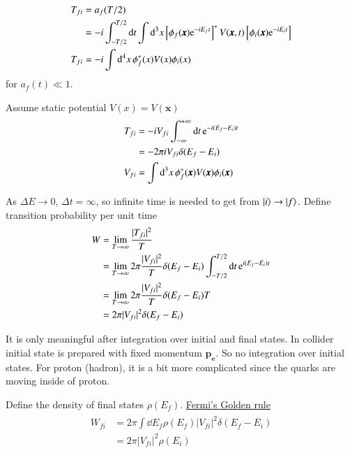 \begin{align}
   T_{fi} &= a_f(T/2) \notag \\
   &= -i \int_{-T/2}^{T/2} \dd{t} \int \dd[3]{x} \left[ \phi_f(\pmb{x}) \mathrm{e}^{-iE_f t} \right]^* V(\pmb x, t) \left[ \phi_i(\pmb x) \mathrm{e}^{-iE_i t} \right] \notag \\
   T_{fi} &= -i \int \dd[4]{x} \phi^*_f (x) V(x) \phi_i (x)
\end{align}
for $a_f(t) \ll 1$.

Assume static potential $V(x) = V(\pmb x)$
\begin{align}
   \begin{split}
    T_{fi} &= -i V_{fi} \int^{+\infty}_{-\infty} \dd{t} \mathrm{e}^{-i(E_f - E_i)t}\\
          &= -2\pi i V_{fi} \delta(E_f - E_i) \\
   V_{fi} &= \int \dd[3]{x} \phi_f^*(\pmb x) V(\pmb{x}) \phi_i(\pmb x)
   \end{split}
\end{align}

As $\Delta E \rightarrow 0$, $\Delta t = \infty$, so infinite time is needed to get from $\ket{i} \rightarrow \ket{f}$. Define transition probability per unit time
\begin{align}
   W &= \lim_{T \rightarrow \infty} \frac{|T_{fi}|^2}{T} \notag \\
     &= \lim_{T \rightarrow \infty} 2 \pi \frac{|V_{fi}|^2}{T} \delta(E_f - E_i) \int_{-T/2}^{T/2} \dd{t} \mathrm{e}^{i(E_f - E_i)t} \notag\\
     &= \lim_{T \rightarrow \infty} 2 \pi \frac{|V_{fi}|^2}{T} \delta(E_f - E_i) T \notag\\
     &= 2\pi |V_{fi}|^2 \delta(E_f - E_i) \label{math:deltaSqaure}
\end{align}

It is only meaningful after integration over initial and final states. In collider initial state is prepared with fixed momentum $\pmb{p_e}$. So no integration over initial states.  For proton (hadron), it is a bit more complicated since the quarks are moving inside of proton.

Define the density of final states $\rho(E_f)$. \underline{Fermi's Golden rule}
\begin{align}
   \begin{split}
      W_{fi} &= 2 \pi \int \dd{E_f} \rho(E_f) |V_{fi}|^2 \delta(E_f - E_i) \\
   &= 2 \pi |V_{fi}|^2 \rho(E_i)
   \end{split}
\end{align}


